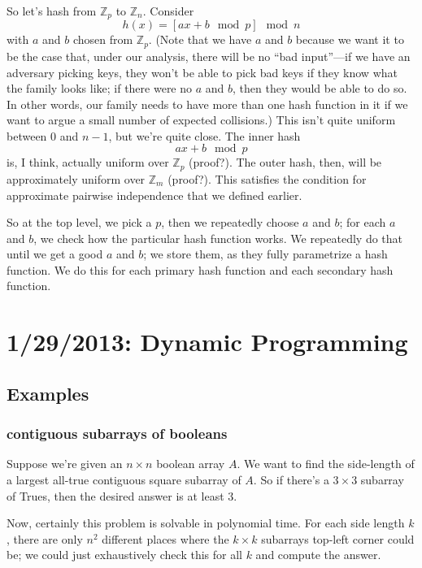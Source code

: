 \documentclass{article}
\newcommand{\Z}{\mathbb{Z}}
\begin{document}
So let's hash from $\Z_p$ to $\Z_n$.
Consider
$$
h(x) = \left[ ax + b \mod p\right]
\mod n
$$
with $a$ and $b$ chosen from $\Z_p$.
(Note that we have $a$ and $b$ because we want it to be the case that,
under our analysis, there will be no ``bad input''---if we have an adversary
picking keys, they won't be able to pick bad keys if they know what the
family looks like; if there were no $a$ and $b$, then they would be
able to do so. In other words, our family needs to have more than one
hash function in it if we want to argue a small number of expected
collisions.)
This isn't quite uniform between $0$ and $n-1$, but we're quite close.
The inner hash
$$
ax + b \mod p
$$
is, I think, actually uniform over $\Z_p$ (proof?).
The outer hash, then, will be approximately uniform over $\Z_m$ (proof?).
This satisfies the condition for approximate pairwise independence
that we defined earlier.

So at the top level, we pick a $p$, then we repeatedly choose $a$ and $b$; for each
$a$ and $b$, we check how the particular hash function works.
We repeatedly do that until we get a good $a$ and $b$; we store them,
as they fully parametrize a hash function.
We do this for each primary hash function and each secondary hash function.





\section{1/29/2013: Dynamic Programming}

\subsection{Examples}

\subsubsection{contiguous subarrays of booleans}
Suppose we're given an $n\times n$ boolean array $A$.
We want to find the side-length of a largest all-true contiguous square
subarray of $A$.
So if there's a $3\times 3$ subarray of Trues, then the desired answer
is at least 3.

Now, certainly this problem is solvable in polynomial time.
For each side length $k$, there are only $n^2$ different places where the
$k\times k$ subarrays top-left corner could be; we could
just exhaustively check this for all $k$ and compute the answer.
\end{document}
